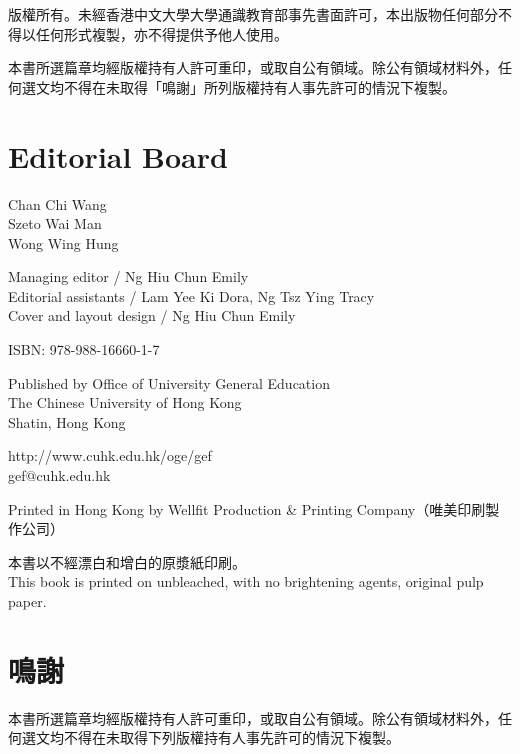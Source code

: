 \vspace{1em}

\noindent 版權所有。未經香港中文大學大學通識教育部事先書面許可，本出版物任何部分不得以任何形式複製，亦不得提供予他人使用。

\noindent 本書所選篇章均經版權持有人許可重印，或取自公有領域。除公有領域材料外，任何選文均不得在未取得「鳴謝」所列版權持有人事先許可的情況下複製。

\section*{Editorial Board}
Chan Chi Wang\\
Szeto Wai Man\\
Wong Wing Hung

\vspace{1em}

\noindent Managing editor / Ng Hiu Chun Emily\\
Editorial assistants / Lam Yee Ki Dora, Ng Tsz Ying Tracy\\
Cover and layout design / Ng Hiu Chun Emily

\vspace{1em}

\noindent ISBN: 978-988-16660-1-7

\vspace{1em}

\noindent Published by Office of University General Education\\
The Chinese University of Hong Kong\\
Shatin, Hong Kong

\vspace{1em}

\noindent http://www.cuhk.edu.hk/oge/gef\\
gef@cuhk.edu.hk

\vspace{1em}

\noindent Printed in Hong Kong by Wellfit Production \& Printing Company（唯美印刷製作公司）

\vspace{1em}

\noindent 本書以不經漂白和增白的原漿紙印刷。\\
This book is printed on unbleached, with no brightening agents, original pulp paper.

\section*{鳴謝}
\noindent 本書所選篇章均經版權持有人許可重印，或取自公有領域。除公有領域材料外，任何選文均不得在未取得下列版權持有人事先許可的情況下複製。

